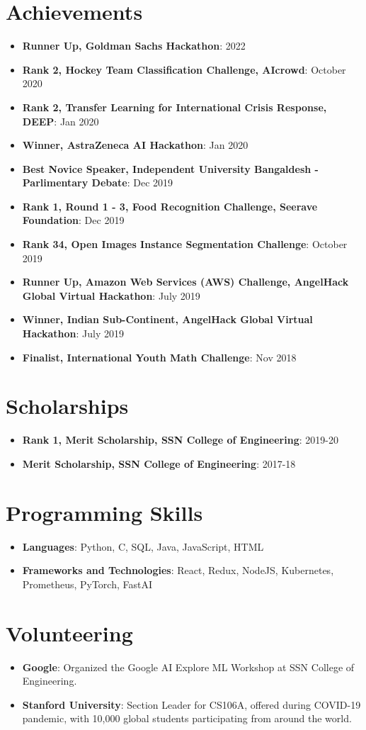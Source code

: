 \documentclass[letterpaper,11pt]{article}
\newcommand{\resumeItem}[2]{
  \item\small{
    \textbf{#1}{: #2 \vspace{-2pt}}
  }
}
\newcommand{\resumeSubItem}[2]{\resumeItem{#1}{#2}\vspace{-4pt}}
\newcommand{\resumeSubHeadingListStart}{\begin{itemize}[leftmargin=*]}
\newcommand{\resumeSubHeadingListEnd}{\end{itemize}}
\begin{document}
\section{Achievements}
  \resumeSubHeadingListStart
  \resumeSubItem
    {Runner Up, Goldman Sachs Hackathon}{2022}
  \resumeSubItem
    {Rank 2, Hockey Team Classification Challenge, AIcrowd}{October 2020}
  \resumeSubItem
    {Rank 2, Transfer Learning for International Crisis Response, DEEP}{Jan 2020}
  \resumeSubItem
    {Winner, AstraZeneca AI Hackathon}{Jan 2020}
  \resumeSubItem
    {Best Novice Speaker, Independent University Bangaldesh - Parlimentary Debate}{Dec 2019}
  \resumeSubItem
    {Rank 1, Round 1 - 3, Food Recognition Challenge, Seerave Foundation}{Dec 2019}
  \resumeSubItem
    {Rank 34, Open Images Instance Segmentation Challenge}{October 2019}
  \resumeSubItem
    {Runner Up, Amazon Web Services (AWS) Challenge, AngelHack Global Virtual Hackathon}{July 2019}
  \resumeSubItem
    {Winner, Indian Sub-Continent, AngelHack Global Virtual Hackathon}{July 2019}
  \resumeSubItem
    {Finalist, International Youth Math Challenge}{Nov 2018}

  \resumeSubHeadingListEnd
\section{Scholarships}
  \resumeSubHeadingListStart
    \resumeSubItem
  {Rank 1, Merit Scholarship, SSN College of Engineering}{2019-20}
      \resumeSubItem
  {Merit Scholarship, SSN College of Engineering}{2017-18}
\resumeSubHeadingListEnd

\section{Programming Skills}
  \resumeSubHeadingListStart
   \item{
     \textbf{Languages}{: Python, C,  SQL, Java, JavaScript, HTML}
      }
      \item{
       \textbf{Frameworks and Technologies}{: React, Redux, NodeJS, Kubernetes, Prometheus, PyTorch, FastAI}
    }
  \resumeSubHeadingListEnd

\section{Volunteering}
\resumeSubHeadingListStart
\resumeItem{Google}{Organized the Google AI Explore ML Workshop at SSN College of Engineering.}
\resumeItem{Stanford University}{Section Leader for CS106A, offered during COVID-19 pandemic, with 10,000 global students participating from around the world.}
\resumeSubHeadingListEnd
\iffalse
\section{Blog}
I also run a blog which you can find at \href{https://rohitmidha23.github.io/blog}{rohitmidha23.github.io/blog}. It has had over 30k page views.
\fi
\end{document}
